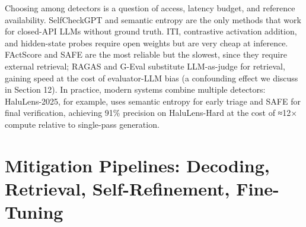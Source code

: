 \documentclass{article}
\begin{document}
Choosing among detectors is a question of access, latency budget, and reference availability. SelfCheckGPT and semantic entropy are the only methods that work for closed-API LLMs without ground truth. ITI, contrastive activation addition, and hidden-state probes require open weights but are very cheap at inference. FActScore and SAFE are the most reliable but the slowest, since they require external retrieval; RAGAS and G-Eval substitute LLM-as-judge for retrieval, gaining speed at the cost of evaluator-LLM bias (a confounding effect we discuss in Section 12). In practice, modern systems combine multiple detectors: HaluLens-2025, for example, uses semantic entropy for early triage and SAFE for final verification, achieving 91\% precision on HaluLens-Hard at the cost of ≈12× compute relative to single-pass generation.

\section{Mitigation Pipelines: Decoding, Retrieval, Self-Refinement, Fine-Tuning}\label{mitigation-pipelines-decoding-retrieval-self-refinement-fine-tuning}
\end{document}
